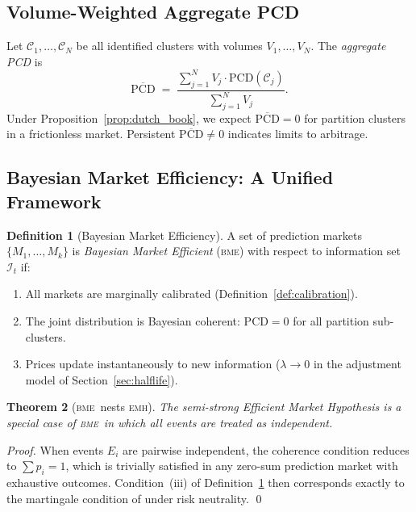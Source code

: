 \documentclass[12pt,a4paper]{article}
\newtheorem{theorem}{Theorem}[section]
\theoremstyle{definition}
\newtheorem{definition}[theorem]{Definition}
\theoremstyle{remark}
\newcommand{\PCD}{\mathrm{PCD}}
\newcommand{\EMH}{\textsc{emh}}
\newcommand{\BME}{\textsc{bme}}
\begin{document}
\subsection{Volume-Weighted Aggregate PCD}

Let $\mathcal{C}_1, \ldots, \mathcal{C}_N$ be all identified clusters with
volumes $V_1, \ldots, V_N$. The \emph{aggregate PCD} is
\begin{equation}
  \overline{\PCD} \;=\; \frac{\sum_{j=1}^{N} V_j \cdot \PCD(\mathcal{C}_j)}{\sum_{j=1}^{N} V_j}.
  \label{eq:agg_pcd}
\end{equation}
Under Proposition~\ref{prop:dutch_book}, we expect $\overline{\PCD} = 0$ for
partition clusters in a frictionless market.
Persistent $\overline{\PCD} \neq 0$ indicates limits to arbitrage.

\subsection{Bayesian Market Efficiency: A Unified Framework}

\begin{definition}[Bayesian Market Efficiency]
\label{def:bme}
A set of prediction markets $\{M_1,\ldots,M_k\}$ is \emph{Bayesian Market
Efficient} (\BME) with respect to information set $\mathcal{I}_t$ if:
\begin{enumerate}[label=(\roman*)]
  \item All markets are marginally calibrated (Definition~\ref{def:calibration}).
  \item The joint distribution is Bayesian coherent: $\PCD = 0$ for all
    partition sub-clusters.
  \item Prices update instantaneously to new information
    ($\lambda \to 0$ in the adjustment model of Section~\ref{sec:halflife}).
\end{enumerate}
\end{definition}

\begin{theorem}[\BME\ nests \EMH]
\label{thm:bme_emh}
The semi-strong Efficient Market Hypothesis is a special case of \BME\ in
which all events are treated as independent.
\end{theorem}

\begin{proof}
When events $E_i$ are pairwise independent, the coherence condition reduces to
$\sum p_i = 1$, which is trivially satisfied in any zero-sum prediction
market with exhaustive outcomes. Condition~(iii) of Definition~\ref{def:bme}
then corresponds exactly to the martingale condition of \citet{fama1970}
under risk neutrality. \qed
\end{proof}
\end{document}
